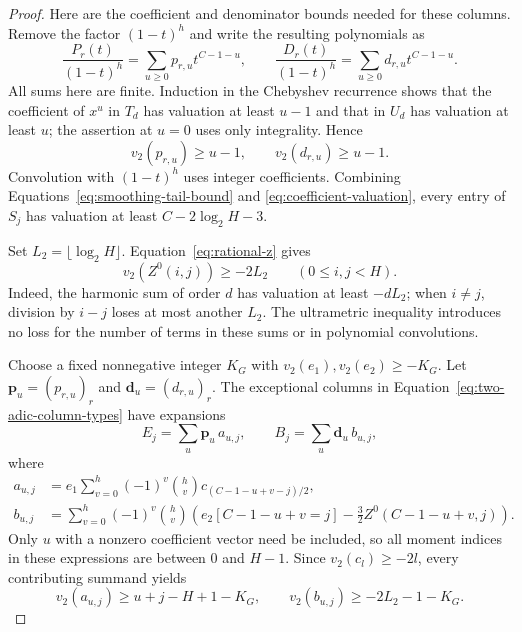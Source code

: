 \begin{proof}
Here are the coefficient and denominator bounds needed for these columns.
Remove the factor $(1-t)^h$ and write the resulting polynomials as
\begin{equation}\label{eq:unconvolved-coefficients}
\frac{P_r(t)}{(1-t)^h}=\sum_{u\ge0}p_{r,u}t^{C-1-u},\qquad
\frac{D_r(t)}{(1-t)^h}=\sum_{u\ge0}d_{r,u}t^{C-1-u}.
\end{equation}
All sums here are finite. Induction in the Chebyshev recurrence shows
that the coefficient of $x^u$ in $T_d$ has valuation at least $u-1$
and that in $U_d$ has valuation at least $u$; the assertion at $u=0$
uses only integrality. Hence
\begin{equation}\label{eq:coefficient-valuation}
v_2(p_{r,u})\ge u-1,\qquad v_2(d_{r,u})\ge u-1.
\end{equation}
Convolution with $(1-t)^h$ uses integer coefficients. Combining
Equations~\eqref{eq:smoothing-tail-bound} and
\eqref{eq:coefficient-valuation}, every entry of $S_j$ has valuation
at least $C-2\log_2H-3$.

Set $L_2=\lfloor\log_2H\rfloor$. Equation~\eqref{eq:rational-z} gives
\begin{equation}\label{eq:harmonic-two-adic}
v_2(Z^0(i,j))\ge-2L_2\qquad(0\le i,j<H).
\end{equation}
Indeed, the harmonic sum of order $d$ has valuation at least $-dL_2$;
when $i\ne j$, division by $i-j$ loses at most another $L_2$.
The ultrametric inequality introduces no loss for the number of terms
in these sums or in polynomial convolutions.

Choose a fixed nonnegative integer $K_G$ with
$v_2(e_1),v_2(e_2)\ge-K_G$. Let $\mathbf p_u=(p_{r,u})_r$ and
$\mathbf d_u=(d_{r,u})_r$. The exceptional columns in
Equation~\eqref{eq:two-adic-column-types} have expansions
\[
E_j=\sum_u\mathbf p_u\,a_{u,j},\qquad
B_j=\sum_u\mathbf d_u\,b_{u,j},
\]
where
\begin{align*}
a_{u,j}&=e_1\sum_{v=0}^h(-1)^v\binom hv
                    c_{(C-1-u+v-j)/2},\\
b_{u,j}&=\sum_{v=0}^h(-1)^v\binom hv
 \left(e_2[C-1-u+v=j]-\frac32Z^0(C-1-u+v,j)\right).
\end{align*}
Only $u$ with a nonzero coefficient vector need be included, so all
moment indices in these expressions are between $0$ and $H-1$.
Since $v_2(c_l)\ge-2l$, every contributing summand yields
\begin{equation}\label{eq:exceptional-scalar-bounds}
v_2(a_{u,j})\ge u+j-H+1-K_G,\qquad
v_2(b_{u,j})\ge-2L_2-1-K_G.
\end{equation}


\end{proof}
